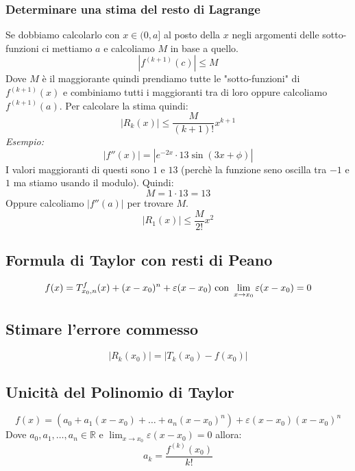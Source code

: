 \documentclass[10pt, a4paper]{article}
\begin{document}
        \subsubsection{Determinare una stima del resto di Lagrange}
            Se dobbiamo calcolarlo con $x\in(0,a]$ al posto della $x$ negli argomenti delle sotto-funzioni ci mettiamo $a$ e calcoliamo $M$ in base a quello.
            \begin{equation*}
                \left|f^{(k+1)}(c)\right|\leq M
            \end{equation*}
            Dove $M$ è il maggiorante quindi prendiamo tutte le "sotto-funzioni" di $f^{(k+1)}(x)$ e combiniamo tutti i maggioranti tra di loro oppure calcoliamo $f^{(k+1)}(a)$. Per calcolare la stima quindi:
            \begin{equation*}
                \left|R_k(x)\right|\leq \frac{M}{(k+1)!}x^{k+1}
            \end{equation*}
            \textit{Esempio:}
            \begin{equation*}
                \left|f''(x)\right|=\left|e^{-2x}\cdot 13\sin(3x+\phi)\right|
            \end{equation*}
            I valori maggioranti di questi sono $1$ e $13$ (perchè la funzione seno oscilla tra $-1$ e $1$ ma stiamo usando il modulo). Quindi:
            \begin{equation*}
                M = 1\cdot 13 = 13
            \end{equation*}
            Oppure calcoliamo $\left|f''(a)\right|$ per trovare $M$.
            \begin{equation*}
                \left|R_1(x)\right|\leq \frac{M}{2!}x^2
            \end{equation*}
    \subsection{Formula di Taylor con resti di Peano}
        \begin{equation*}
                f(x)= \taylor{f}{x_0}{n}(x) + (x-x_0)^n + \varepsilon(x-x_0) \text{ con } \lim_{x\rightarrow x_0} \varepsilon(x-x_0) = 0
        \end{equation*}
    \subsection{Stimare l'errore commesso}
        $$
        |R_k(x_0)|=|T_k(x_0)-f(x_0)|
        $$
    \subsection{Unicità del Polinomio di Taylor}
    \begin{equation*}
        f(x)=(a_0+a_1(x-x_0)+\ldots+a_n(x-x_0)^n)+\varepsilon(x-x_0)(x-x_0)^n
    \end{equation*}
    Dove $a_0,a_1,\ldots,a_n\in\mathbb{R}$ e $\lim_{x\rightarrow x_0}\varepsilon(x-x_0)=0$ allora:
    \begin{equation*}
        a_k = \frac{f^{(k)}(x_0)}{k!}
    \end{equation*}
\newpage
\end{document}
